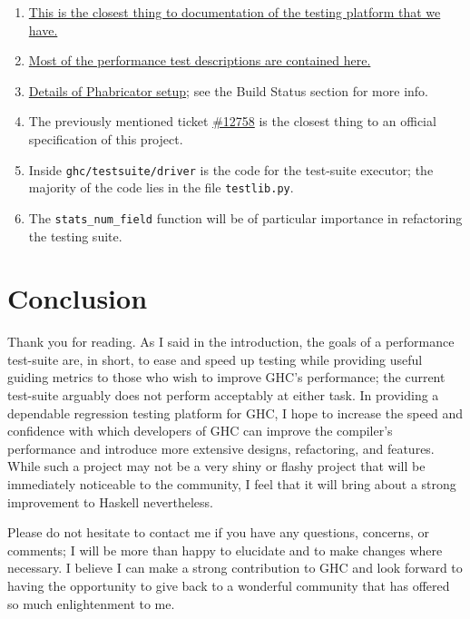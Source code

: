 \documentclass{article}
\newcommand{\code}{\texttt}
\begin{document}
\begin{enumerate}
\item \href{https://ghc.haskell.org/trac/ghc/wiki/Building/RunningTests/Adding}{This is the closest thing to documentation of the testing platform that we have.}
\item \href{https://ghc.haskell.org/trac/ghc/browser/ghc/testsuite/tests/perf/compiler/all.T}{Most of the performance test descriptions are contained here.}
\item \href{https://ghc.haskell.org/trac/ghc/wiki/Phabricator}{Details of Phabricator setup}; see the Build Status section for more info. %
\item The previously mentioned ticket \href{https://ghc.haskell.org/trac/ghc/ticket/12758}{\#12758} is the closest thing to an official specification of this project.
\item Inside \code{ghc/testsuite/driver} is the code for the test-suite executor; the majority of the code lies in the file \code{testlib.py}.
\item The \code{stats\_num\_field} function will be of particular importance in refactoring the testing suite.
\end{enumerate}

\section*{Conclusion}
Thank you for reading.
As I said in the introduction, the goals of a performance test-suite are, in short, to ease and speed up testing while providing useful guiding metrics to those who wish to improve GHC's performance; the current test-suite arguably does not perform acceptably at either task.
In providing a dependable regression testing platform for GHC, I hope to increase the speed and confidence with which developers of GHC can improve the compiler's performance and introduce more extensive designs, refactoring, and features.
While such a project may not be a very shiny or flashy project that will be immediately noticeable to the community, I feel that it will bring about a strong improvement to Haskell nevertheless.

Please do not hesitate to contact me if you have any questions, concerns, or comments; I will be more than happy to elucidate and to make changes where necessary.
I believe I can make a strong contribution to GHC and look forward to having the opportunity to give back to a wonderful community that has offered so much enlightenment to me.
\end{document}

